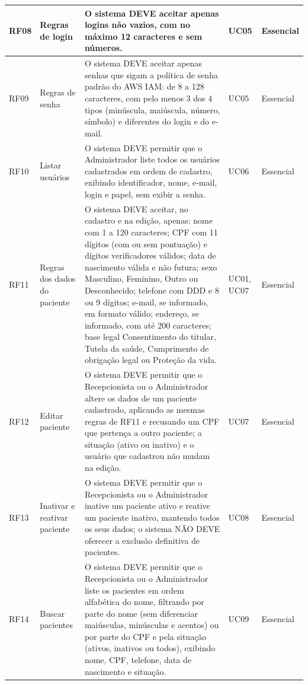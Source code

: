 {\begin{longtable}{|p{0.13\requirementsWidth}|p{0.19\requirementsWidth}|p{0.42\requirementsWidth}|p{0.12\requirementsWidth}|p{0.14\requirementsWidth}|}
\raggedright RF08 & \raggedright Regras de login & \raggedright O sistema DEVE aceitar apenas logins não vazios, com no máximo 12 caracteres e sem números. & \raggedright UC05 & \raggedright Essencial \tabularnewline \hline
\raggedright RF09 & \raggedright Regras de senha & \raggedright O sistema DEVE aceitar apenas senhas que sigam a política de senha padrão do AWS IAM: de 8 a 128 caracteres, com pelo menos 3 dos 4 tipos (minúscula, maiúscula, número, símbolo) e diferentes do login e do e-mail. & \raggedright UC05 & \raggedright Essencial \tabularnewline \hline
\raggedright RF10 & \raggedright Listar usuários & \raggedright O sistema DEVE permitir que o Administrador liste todos os usuários cadastrados em ordem de cadastro, exibindo identificador, nome, e-mail, login e papel, sem exibir a senha. & \raggedright UC06 & \raggedright Essencial \tabularnewline \hline
\raggedright RF11 & \raggedright Regras dos dados do paciente & \raggedright O sistema DEVE aceitar, no cadastro e na edição, apenas: nome com 1 a 120 caracteres; CPF com 11 dígitos (com ou sem pontuação) e dígitos verificadores válidos; data de nascimento válida e não futura; sexo Masculino, Feminino, Outro ou Desconhecido; telefone com DDD e 8 ou 9 dígitos; e-mail, se informado, em formato válido; endereço, se informado, com até 200 caracteres; base legal Consentimento do titular, Tutela da saúde, Cumprimento de obrigação legal ou Proteção da vida. & \raggedright UC01, UC07 & \raggedright Essencial \tabularnewline \hline
\raggedright RF12 & \raggedright Editar paciente & \raggedright O sistema DEVE permitir que o Recepcionista ou o Administrador altere os dados de um paciente cadastrado, aplicando as mesmas regras de RF11 e recusando um CPF que pertença a outro paciente; a situação (ativo ou inativo) e o usuário que cadastrou não mudam na edição. & \raggedright UC07 & \raggedright Essencial \tabularnewline \hline
\raggedright RF13 & \raggedright Inativar e reativar paciente & \raggedright O sistema DEVE permitir que o Recepcionista ou o Administrador inative um paciente ativo e reative um paciente inativo, mantendo todos os seus dados; o sistema NÃO DEVE oferecer a exclusão definitiva de pacientes. & \raggedright UC08 & \raggedright Essencial \tabularnewline \hline
\raggedright RF14 & \raggedright Buscar pacientes & \raggedright O sistema DEVE permitir que o Recepcionista ou o Administrador liste os pacientes em ordem alfabética do nome, filtrando por parte do nome (sem diferenciar maiúsculas, minúsculas e acentos) ou por parte do CPF e pela situação (ativos, inativos ou todos), exibindo nome, CPF, telefone, data de nascimento e situação. & \raggedright UC09 & \raggedright Essencial \tabularnewline \hline

\end{longtable}}
